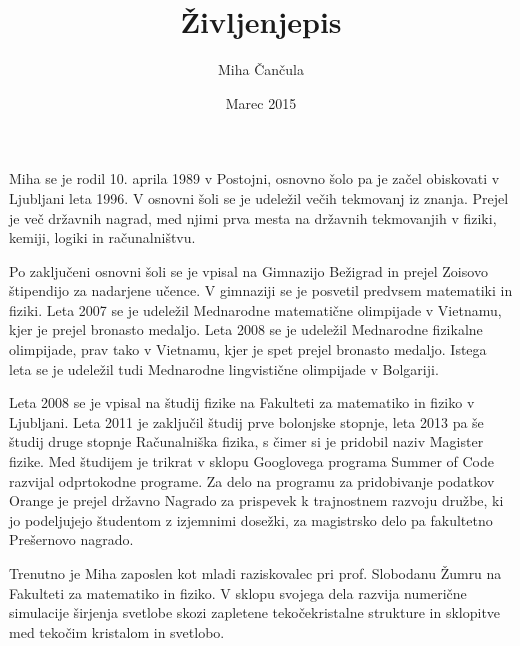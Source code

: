 \documentclass[a4paper]{article}
\title{\v Zivljenjepis}
\author{Miha \v Can\v cula}
\date{Marec 2015}
\begin{document}
\maketitle

Miha se je rodil 10. aprila 1989 v Postojni, osnovno šolo pa je začel obiskovati v Ljubljani leta 1996. V osnovni šoli se je udeležil večih tekmovanj iz znanja. Prejel je več državnih nagrad, med njimi prva mesta na državnih tekmovanjih v fiziki, kemiji, logiki in računalništvu. 

Po zaključeni osnovni šoli se je vpisal na Gimnazijo Bežigrad in prejel Zoisovo štipendijo za nadarjene učence. V gimnaziji se je posvetil predvsem matematiki in fiziki. Leta 2007 se je udeležil Mednarodne matematične olimpijade v Vietnamu, kjer je prejel bronasto medaljo. Leta 2008 se je udeležil Mednarodne fizikalne olimpijade, prav tako v Vietnamu, kjer je spet prejel bronasto medaljo. Istega leta se je udeležil tudi Mednarodne lingvistične olimpijade v Bolgariji. 

Leta 2008 se je vpisal na študij fizike na Fakulteti za matematiko in fiziko v Ljubljani. Leta 2011 je zaključil študij prve bolonjske stopnje, leta 2013 pa še študij druge stopnje Računalniška fizika, s čimer si je pridobil naziv Magister fizike. Med študijem je trikrat v sklopu Googlovega programa Summer of Code razvijal odprtokodne programe. Za delo na programu za pridobivanje podatkov Orange je prejel državno Nagrado za prispevek k trajnostnem razvoju družbe, ki jo podeljujejo študentom z izjemnimi dosežki, za magistrsko delo pa fakultetno Prešernovo nagrado. 

Trenutno je Miha zaposlen kot mladi raziskovalec pri prof. Slobodanu Žumru na Fakulteti za matematiko in fiziko. V sklopu svojega dela razvija numerične simulacije širjenja svetlobe skozi zapletene tekočekristalne strukture in sklopitve med tekočim kristalom in svetlobo. 
\end{document}
